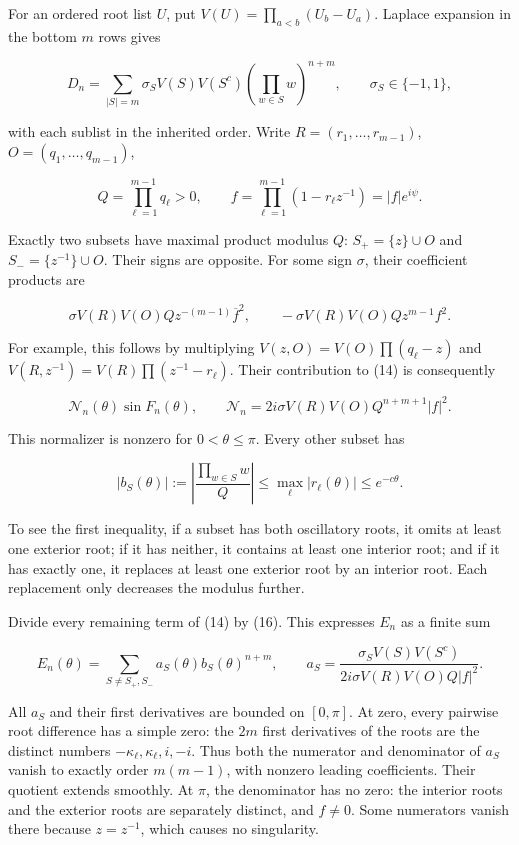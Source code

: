 \documentclass[10pt,a4paper]{article}
\begin{document}
For an ordered root list \(U\), put \(V(U)=\prod_{a<b}(U_b-U_a)\). Laplace expansion in the bottom \(m\) rows gives

\nopagebreak[3]
\[
D_n=\sum_{|S|=m}\sigma_S V(S)V(S^c)
             \left(\prod_{w\in S}w\right)^{n+m},\qquad \sigma_S\in\{-1,1\},
\tag{14}
\]

with each sublist in the inherited order. Write \(R=(r_1,\ldots,r_{m-1})\), \(O=(q_1,\ldots,q_{m-1})\),

\nopagebreak[3]
\[
Q=\prod_{\ell=1}^{m-1}q_\ell>0,\qquad
f=\prod_{\ell=1}^{m-1}(1-r_\ell z^{-1})=|f|e^{i\psi}.
\]

Exactly two subsets have maximal product modulus \(Q\): \(S_+=\{z\}\cup O\) and \(S_-=\{z^{-1}\}\cup O\). Their signs are opposite. For some sign \(\sigma\), their coefficient products are

\nopagebreak[3]
\[
\sigma V(R)V(O)Q z^{-(m-1)}\overline f^{2},\qquad
-\sigma V(R)V(O)Q z^{m-1}f^2.
\tag{15}
\]

For example, this follows by multiplying \(V(z,O)=V(O)\prod(q_\ell-z)\) and \(V(R,z^{-1})=V(R)\prod(z^{-1}-r_\ell)\). Their contribution to (14) is consequently

\nopagebreak[3]
\[
\mathcal N_n(\theta)\sin F_n(\theta),\qquad
\mathcal N_n=2i\sigma V(R)V(O)Q^{n+m+1}|f|^2.
\tag{16}
\]

This normalizer is nonzero for \(0<\theta\le\pi\). Every other subset has

\nopagebreak[3]
\[
\left|b_S(\theta)\right|:=\left|\frac{\prod_{w\in S}w}{Q}\right|
\le \max_\ell|r_\ell(\theta)|\le e^{-c\theta}.
\tag{17}
\]

To see the first inequality, if a subset has both oscillatory roots, it omits at least one exterior root; if it has neither, it contains at least one interior root; and if it has exactly one, it replaces at least one exterior root by an interior root. Each replacement only decreases the modulus further.

Divide every remaining term of (14) by (16). This expresses \(E_n\) as a finite sum

\nopagebreak[3]
\[
E_n(\theta)=\sum_{S\ne S_+,S_-}a_S(\theta)b_S(\theta)^{n+m},
\qquad
a_S=\frac{\sigma_S V(S)V(S^c)}{2i\sigma V(R)V(O)Q|f|^2}.
\tag{18}
\]

All \(a_S\) and their first derivatives are bounded on \([0,\pi]\). At zero, every pairwise root difference has a simple zero: the \(2m\) first derivatives of the roots are the distinct numbers \(-\kappa_\ell,\kappa_\ell,i,-i\). Thus both the numerator and denominator of \(a_S\) vanish to exactly order \(m(m-1)\), with nonzero leading coefficients. Their quotient extends smoothly. At \(\pi\), the denominator has no zero: the interior roots and the exterior roots are separately distinct, and \(f\ne0\). Some numerators vanish there because \(z=z^{-1}\), which causes no singularity.
\end{document}

